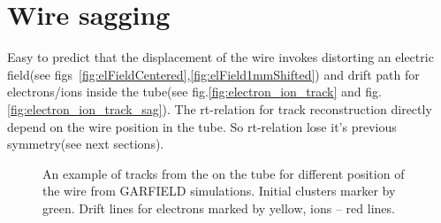 \section{Wire sagging}

	Easy to predict that the displacement of the wire invokes distorting an electric field(see figs~\ref{fig:elFieldCentered},\ref{fig:elField1mmShifted}) and drift path for electrons/ions inside the tube(see fig.\ref{fig:electron_ion_track} and fig.\ref{fig:electron_ion_track_sag}). The rt-relation for track reconstruction directly depend on the wire position in the tube. So rt-relation lose it's previous symmetry(see next sections).
	
	\begin{figure}[h!]
		\centering
		\qquad
		\caption{ An example of tracks from the on the tube for different position of the wire from GARFIELD simulations. Initial clusters marker by green. Drift lines for electrons marked by yellow, ions -- red lines.}	
	\end{figure}
	

